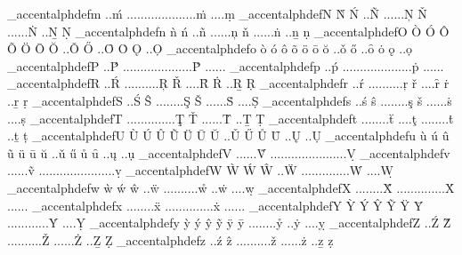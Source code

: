 {\brl@document_accentalphdef{m} {..}{ḿ} {..}{..}{..}{..}{..}{..}{..}{..}{..}{..}{ṁ} {..}{..}{ṃ}
\brl@document_accentalphdef{N} {Ǹ} {Ń} {..}{Ñ} {..}{..}{..}{Ņ} {Ň} {..}{..}{..}{Ṅ} {..}{Ṉ} {Ṇ}
\brl@document_accentalphdef{n} {ǹ} {ń} {..}{ñ} {..}{..}{..}{ņ} {ň} {..}{..}{..}{ṅ} {..}{ṉ} {ṇ}
\brl@document_accentalphdef{O} {Ò} {Ó} {Ô} {Õ} {Ö} {Ō} {Ŏ} {..}{Ǒ} {Ő} {..}{Ȏ} {Ȯ} {Ǫ} {..}{Ọ}
\brl@document_accentalphdef{o} {ò} {ó} {ô} {õ} {ö} {ō} {ŏ} {..}{ǒ} {ő} {..}{ȏ} {ȯ} {ǫ} {..}{ọ}
\brl@document_accentalphdef{P} {..}{Ṕ} {..}{..}{..}{..}{..}{..}{..}{..}{..}{..}{Ṗ} {..}{..}{..}
\brl@document_accentalphdef{p} {..}{ṕ} {..}{..}{..}{..}{..}{..}{..}{..}{..}{..}{ṗ} {..}{..}{..}
\brl@document_accentalphdef{R} {..}{Ŕ} {..}{..}{..}{..}{..}{Ŗ} {Ř} {..}{..}{Ȓ} {Ṙ} {..}{Ṟ} {Ṛ}
\brl@document_accentalphdef{r} {..}{ŕ} {..}{..}{..}{..}{..}{ŗ} {ř} {..}{..}{ȓ} {ṙ} {..}{ṟ} {ṛ}
\brl@document_accentalphdef{S} {..}{Ś} {Ŝ} {..}{..}{..}{..}{Ş} {Š} {..}{..}{..}{Ṡ} {..}{..}{Ṣ}
\brl@document_accentalphdef{s} {..}{ś} {ŝ} {..}{..}{..}{..}{ş} {š} {..}{..}{..}{ṡ} {..}{..}{ṣ}
\brl@document_accentalphdef{T} {..}{..}{..}{..}{..}{..}{..}{Ţ} {Ť} {..}{..}{..}{Ṫ} {..}{Ṯ} {Ṭ}
\brl@document_accentalphdef{t} {..}{..}{..}{..}{ẗ} {..}{..}{ţ} {..}{..}{..}{..}{ṫ} {..}{ṯ} {ṭ}
\brl@document_accentalphdef{U} {Ù} {Ú} {Û} {Ũ} {Ü} {Ū} {Ŭ} {..}{Ǔ} {Ű} {Ů} {Ȗ} {..}{Ų} {..}{Ụ}
\brl@document_accentalphdef{u} {ù} {ú} {û} {ũ} {ü} {ū} {ŭ} {..}{ǔ} {ű} {ů} {ȗ} {..}{ų} {..}{ụ}
\brl@document_accentalphdef{V} {..}{..}{..}{Ṽ} {..}{..}{..}{..}{..}{..}{..}{..}{..}{..}{..}{Ṿ}
\brl@document_accentalphdef{v} {..}{..}{..}{ṽ} {..}{..}{..}{..}{..}{..}{..}{..}{..}{..}{..}{ṿ}
\brl@document_accentalphdef{W} {Ẁ} {Ẃ} {Ŵ} {..}{Ẅ} {..}{..}{..}{..}{..}{..}{..}{Ẇ} {..}{..}{Ẉ}
\brl@document_accentalphdef{w} {ẁ} {ẃ} {ŵ} {..}{ẅ} {..}{..}{..}{..}{..}{ẘ} {..}{ẇ} {..}{..}{ẉ}
\brl@document_accentalphdef{X} {..}{..}{..}{..}{Ẍ} {..}{..}{..}{..}{..}{..}{..}{Ẋ} {..}{..}{..}
\brl@document_accentalphdef{x} {..}{..}{..}{..}{ẍ} {..}{..}{..}{..}{..}{..}{..}{ẋ} {..}{..}{..}
\brl@document_accentalphdef{Y} {Ỳ} {Ý} {Ŷ} {Ỹ} {Ÿ} {Ȳ} {..}{..}{..}{..}{..}{..}{Ẏ} {..}{..}{Ỵ}
\brl@document_accentalphdef{y} {ỳ} {ý} {ŷ} {ỹ} {ÿ} {ȳ} {..}{..}{..}{..}{ẙ} {..}{ẏ} {..}{..}{ỵ}
\brl@document_accentalphdef{Z} {..}{Ź} {Ẑ} {..}{..}{..}{..}{..}{Ž} {..}{..}{..}{Ż} {..}{Ẕ} {Ẓ}
\brl@document_accentalphdef{z} {..}{ź} {ẑ} {..}{..}{..}{..}{..}{ž} {..}{..}{..}{ż} {..}{ẕ} {ẓ}


%
%
% 

}
